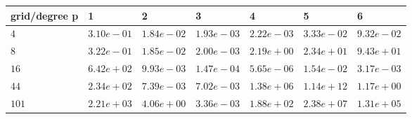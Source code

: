 \begin{tabular}{lllllll}
\hline
 grid/degree p   & 1          & 2          & 3          & 4          & 5          & 6          \\
\hline
 $4$             & $3.10e-01$ & $1.84e-02$ & $1.93e-03$ & $2.22e-03$ & $3.33e-02$ & $9.32e-02$ \\
 $8$             & $3.22e-01$ & $1.85e-02$ & $2.00e-03$ & $2.19e+00$ & $2.34e+01$ & $9.43e+01$ \\
 $16$            & $6.42e+02$ & $9.93e-03$ & $1.47e-04$ & $5.65e-06$ & $1.54e-02$ & $3.17e-03$ \\
 $44$            & $2.34e+02$ & $7.39e-03$ & $7.02e-03$ & $1.38e+06$ & $1.14e+12$ & $1.17e+00$ \\
 $101$           & $2.21e+03$ & $4.06e+00$ & $3.36e-03$ & $1.88e+02$ & $2.38e+07$ & $1.31e+05$ \\
\hline
\end{tabular}